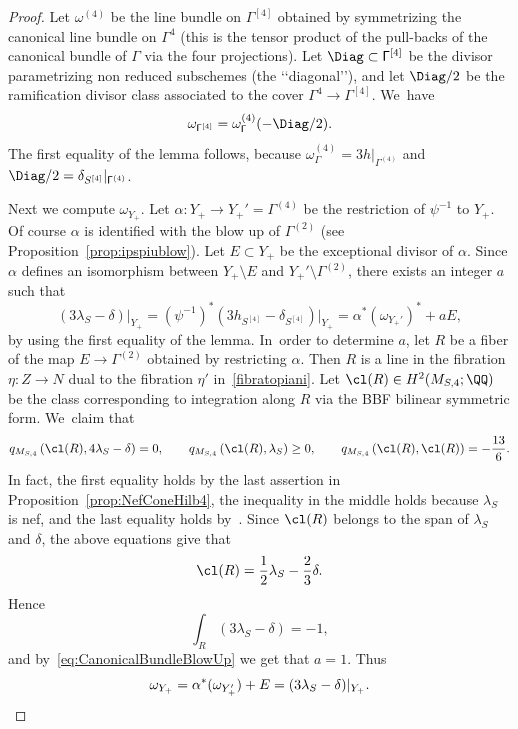 \begin{proof}
Let $\omega^{(4)}$ be the line bundle on $\mathsf{\Gamma}^{[4]}$ obtained by symmetrizing the canonical line bundle on $\mathsf{\Gamma}^4$ (this is the tensor product of the pull-backs of the canonical bundle of $\mathsf{\Gamma}$ via the four projections). Let $\Diag\subset \mathsf{\Gamma}^{[4]}$ be the divisor parametrizing non reduced subschemes (the \lq\lq diagonal\rq\rq), and let $\Diag/2$ be the ramification divisor class associated to the cover $\mathsf{\Gamma}^4\to \mathsf{\Gamma}^{[4]}$. We~have
\[
\omega_{\mathsf{\Gamma}^{[4]}}=\omega^{(4)}_{\mathsf{\Gamma}}(-\Diag/2).
\]
The first equality of the lemma follows, because $\omega^{(4)}_{\mathsf{\Gamma}}=3 h \vert_{\mathsf{\Gamma}^{(4)}}$ and $\Diag/2=\delta_{S^{[4]}}\vert_{\mathsf{\Gamma}^{(4)}}$.

Next we compute $\omega_{Y_+}$. Let $\alpha\colon Y_{+}\to Y_{+}'=\mathsf{\Gamma}^{(4)}$ be the restriction of $\psi^{-1}$ to $Y_{+}$. Of course $\alpha$ is identified with the blow up of $\mathsf{\Gamma}^{(2)}$ (see Proposition~\ref{prop:ipspiublow}).
Let $E\subset Y_+$ be the exceptional divisor of $\alpha$.
Since $\alpha$ defines an isomorphism between $Y_{+}\setminus E$ and $Y_{+}'\setminus \mathsf{\Gamma}^{(2)}$, there exists an integer $a$ such that
\begin{equation}\label{eq:CanonicalBundleBlowUp}
(3 \lambda_S - \delta)\vert_{Y_+} = (\psi^{-1})^{*}(3 h_{S^{[4]}} - \delta_{S^{[4]}})\vert_{Y_+} = \alpha^{*}(\omega_{Y_{+}'})^*+ a E,
\end{equation}
by using the first equality of the lemma. In~order to determine $a$, let $R$ be a fiber of the map $E\to \mathsf{\Gamma}^{(2)}$ obtained by restricting $\alpha$. Then $R$ is a line in the fibration $\eta\colon Z\to N$ dual to the fibration $\eta'$ in~\eqref{fibratopiani}. Let $\cl(R)\in H^2(M_{S,4};\QQ)$ be the class corresponding to integration along $R$ via the BBF bilinear symmetric form. We~claim that
\begin{equation*}
q_{M_{S,4}}\left(\cl(R),4\lambda_S-\delta\right)=0,\qquad
q_{M_{S,4}}\left(\cl(R),\lambda_S\right)\ge 0,\qquad
q_{M_{S,4}}\left(\cl(R),\cl(R)\right)=-\frac{13}{6}.
\end{equation*}
In fact, the first equality holds by the last assertion in
Proposition~\ref{prop:NefConeHilb4}, the inequality in the middle holds because $\lambda_S$ is nef, and the last equality holds by~\cite[Table\,H4]{HT:IntersectionNumbers}.
Since $\cl(R)$ belongs to the span of $\lambda_S$ and $\delta$, the above equations give that
\[
\cl(R) = \frac 12 \lambda_S - \frac 23 \delta.
\]
Hence
\[
\int_R(3\lambda_S - \delta) = -1,
\]
and by~\eqref{eq:CanonicalBundleBlowUp} we get that $a=1$. Thus
\[
\omega_{Y_+} = \alpha^*(\omega_{Y_+'}) + E = (3 \lambda_S - \delta)\vert_{Y_+}.\qedhere
\]
\end{proof}

